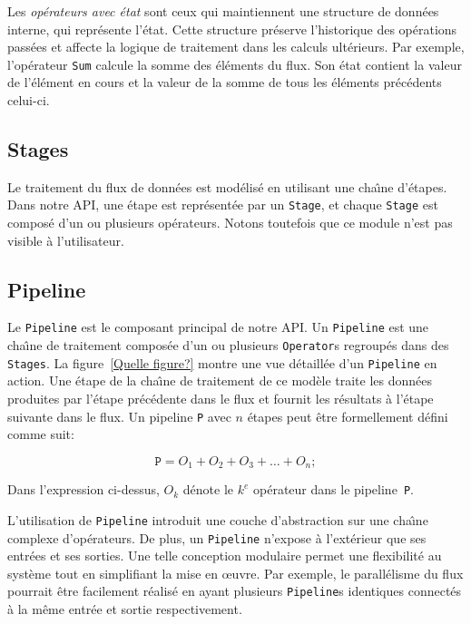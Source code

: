 

Les \emph{op\'erateurs avec \'etat} sont ceux qui maintiennent une structure de donn\'ees interne, qui repr\'esente l'\'etat. Cette structure pr\'eserve l'historique des op\'erations pass\'ees et affecte la logique de traitement dans les calculs ult\'erieurs. Par exemple, l'op\'erateur \texttt{Sum} calcule la somme des \'el\'ements du flux. Son \'etat contient la valeur de l'\'el\'ement en cours et la valeur de la somme de tous les \'el\'ements pr\'ec\'edents celui-ci. 


\subsection{Stages}

Le traitement du flux de donn\'ees est mod\'elis\'e en utilisant une cha\^{\i}ne d'\'etapes. Dans notre API, une \'etape est repr\'esent\'ee par un \texttt{Stage}, et chaque \texttt{Stage} est compos\'e d'un ou plusieurs op\'erateurs. Notons toutefois que ce module n'est pas visible \`a l'utilisateur. 



\subsection{Pipeline}

Le \texttt{Pipeline} est le composant principal de notre API. Un \texttt{Pipeline} est une cha\^{\i}ne de traitement compos\'ee d'un ou plusieurs \texttt{Operator}s regroup\'es dans des \texttt{Stages}. La figure~\ref{Quelle figure?} montre une vue d\'etaill\'ee d'un \texttt{Pipeline} en action. Une \'etape de la cha\^{\i}ne de traitement de ce mod\`ele traite les donn\'ees produites par l'\'etape pr\'ec\'edente dans le flux et fournit les r\'esultats \`a l'étape suivante dans le flux. Un pipeline \texttt{P} avec $n$ \'etapes peut \^etre formellement d\'efini comme suit:


\[
	\texttt{P} = O_1 + O_2 + O_3 + \ldots + O_n;
\]


Dans l'expression ci-dessus, $O_k$ d\'enote le $k^e$ op\'erateur dans le pipeline~\texttt{P}.

L'utilisation de \texttt{Pipeline} introduit une couche d'abstraction sur une cha\^{\i}ne complexe d'op\'erateurs. De plus, un \texttt{Pipeline} n'expose à l'ext\'erieur que ses entr\'ees et ses sorties. Une telle conception modulaire permet une flexibilit\'e au syst\`eme tout en simplifiant la mise en œuvre. Par exemple, le parall\'elisme du flux pourrait \^etre facilement r\'ealis\'e en ayant plusieurs \texttt{Pipeline}s identiques connect\'es \`a la m\^eme entr\'ee et sortie respectivement.


